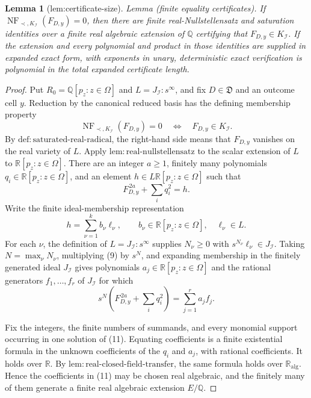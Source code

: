 \documentclass{article}
\newtheorem{lemma}{Lemma}
\begin{document}
\begin{lemma}[lem:certificate-size]\label{lem:certificate-size}
Lemma (finite equality certificates).  If \(\operatorname{NF}_{\prec,K_{\mathcal I}}(F_{D,y})=0\), then there are finite real-Nullstellensatz and saturation identities over a finite real algebraic extension of \(\mathbb Q\) certifying that \(F_{D,y}\in K_{\mathcal I}\).  If the extension and every polynomial and product in those identities are supplied in expanded exact form, with exponents in unary, deterministic exact verification is polynomial in the total expanded certificate length.
\end{lemma}
\begin{proof}
Put \(R_0=\mathbb Q[p_z:z\in\Omega]\) and \(L=J_{\mathcal I}:s^{\infty}\), and fix \(D\in\mathfrak D\) and an outcome cell \(y\).  Reduction by the canonical reduced basis has the defining membership property
\[
 \operatorname{NF}_{\prec,K_{\mathcal I}}(F_{D,y})=0
 \quad\Longleftrightarrow\quad
 F_{D,y}\in K_{\mathcal I}. \tag{8}
\]
By \(\mathrm{def{:}saturated\text{-}real\text{-}radical}\), the right-hand side means that \(F_{D,y}\) vanishes on the real variety of \(L\).  Apply \(\mathrm{lem{:}real\text{-}nullstellensatz}\) to the scalar extension of \(L\) to \(\mathbb R[p_z:z\in\Omega]\).  There are an integer \(a\geq1\), finitely many polynomials \(q_i\in\mathbb R[p_z:z\in\Omega]\), and an element \(h\in L\mathbb R[p_z:z\in\Omega]\) such that
\[
 F_{D,y}^{\,2a}+\sum_iq_i^2=h. \tag{9}
\]
Write the finite ideal-membership representation
\[
 h=\sum_{\nu=1}^k b_\nu\ell_\nu,
 \qquad b_\nu\in\mathbb R[p_z:z\in\Omega],
 \quad \ell_\nu\in L. \tag{10}
\]
For each \(\nu\), the definition of \(L=J_{\mathcal I}:s^\infty\) supplies \(N_\nu\geq0\) with \(s^{N_\nu}\ell_\nu\in J_{\mathcal I}\).  Taking \(N=\max_\nu N_\nu\), multiplying (9) by \(s^N\), and expanding membership in the finitely generated ideal \(J_{\mathcal I}\) gives polynomials \(a_j\in\mathbb R[p_z:z\in\Omega]\) and the rational generators \(f_1,\ldots,f_r\) of \(J_{\mathcal I}\) for which
\[
 s^N\left(F_{D,y}^{\,2a}+\sum_iq_i^2\right)
 =\sum_{j=1}^r a_jf_j. \tag{11}
\]

Fix the integers, the finite numbers of summands, and every monomial support occurring in one solution of (11).  Equating coefficients is a finite existential formula in the unknown coefficients of the \(q_i\) and \(a_j\), with rational coefficients.  It holds over \(\mathbb R\).  By \(\mathrm{lem{:}real\text{-}closed\text{-}field\text{-}transfer}\), the same formula holds over \(\mathbb R_{\mathrm{alg}}\).  Hence the coefficients in (11) may be chosen real algebraic, and the finitely many of them generate a finite real algebraic extension \(E/\mathbb Q\).


\end{proof}
\end{document}
